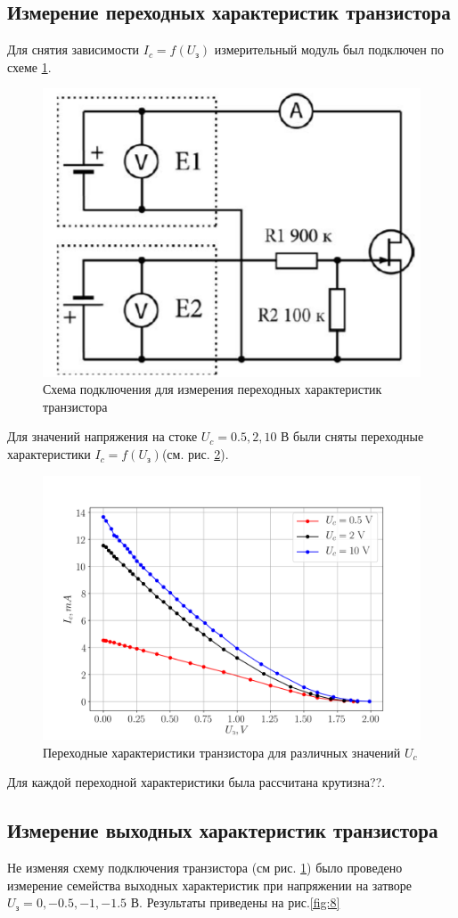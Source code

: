 \subsection{Измерение переходных характеристик транзистора}
Для снятия зависимости $I_c = f(U_{\text{з}})$ измерительный модуль был подключен по схеме \ref{fig:6}.
\begin{figure}[h!]
	\centering
	\includegraphics[width=0.4\linewidth]{imgs/ex1.png}
	\caption{Схема подключения для измерения переходных характеристик транзистора}
	\label{fig:6}
\end{figure}

Для значений напряжения на стоке $U_c = 0.5,2,10$ В были сняты переходные характеристики $I_c = f(U_{\text{з}})$(см.
рис. \ref{fig:7}). 

\begin{figure}[h!]
	\centering
	\includegraphics[width=0.8\linewidth]{fig/task1.png}
	\caption{Переходные характеристики транзистора для различных значений $U_c$}
	\label{fig:7}
\end{figure}

Для каждой переходной характеристики была рассчитана крутизна??.

\subsection{Измерение выходных характеристик транзистора}
Не изменяя схему подключения транзистора (см рис. \ref{fig:6}) было проведено измерение семейства выходных характеристик
при напряжении на затворе $U_{\text{з}} = 0,-0.5,-1,-1.5$ В. Результаты приведены на рис.\ref{fig:8}

